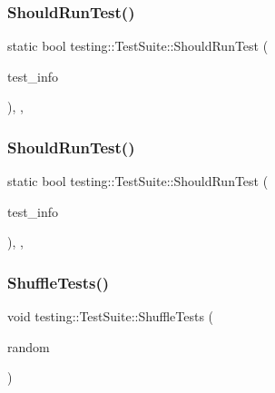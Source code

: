 \mbox{\label{classtesting_1_1_test_suite_ad6db30ec4e23a809f398dc2f50008541}} 
\subsubsection{\texorpdfstring{ShouldRunTest()}{ShouldRunTest()}\hspace{0.1cm}{\footnotesize\ttfamily [1/2]}}
{\footnotesize\ttfamily static bool testing\+::\+Test\+Suite\+::\+Should\+Run\+Test (\begin{DoxyParamCaption}\item[{const \mbox{\hyperlink{classtesting_1_1_test_info}{Test\+Info}} $\ast$}]{test\+\_\+info }\end{DoxyParamCaption})\hspace{0.3cm}{\ttfamily [inline]}, {\ttfamily [static]}, {\ttfamily [private]}}

\mbox{\label{classtesting_1_1_test_suite_ad6db30ec4e23a809f398dc2f50008541}} 
\subsubsection{\texorpdfstring{ShouldRunTest()}{ShouldRunTest()}\hspace{0.1cm}{\footnotesize\ttfamily [2/2]}}
{\footnotesize\ttfamily static bool testing\+::\+Test\+Suite\+::\+Should\+Run\+Test (\begin{DoxyParamCaption}\item[{const \mbox{\hyperlink{classtesting_1_1_test_info}{Test\+Info}} $\ast$}]{test\+\_\+info }\end{DoxyParamCaption})\hspace{0.3cm}{\ttfamily [inline]}, {\ttfamily [static]}, {\ttfamily [private]}}

\mbox{\label{classtesting_1_1_test_suite_ab5c2055e93f43a2029e36adc5d75347a}} 
\subsubsection{\texorpdfstring{ShuffleTests()}{ShuffleTests()}\hspace{0.1cm}{\footnotesize\ttfamily [1/2]}}
{\footnotesize\ttfamily void testing\+::\+Test\+Suite\+::\+Shuffle\+Tests (\begin{DoxyParamCaption}\item[{\mbox{\hyperlink{classtesting_1_1internal_1_1_random}{internal\+::\+Random}} $\ast$}]{random }\end{DoxyParamCaption})\hspace{0.3cm}{\ttfamily [private]}}

